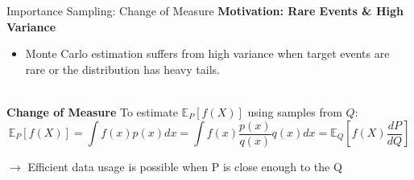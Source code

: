 \documentclass[]{beamer}
\begin{document}



    

\begin{frame}{Importance Sampling: Change of Measure}
    \textbf{Motivation: Rare Events \& High Variance}
    \begin{itemize}
        \item Monte Carlo estimation suffers from high variance when target events are rare or the distribution has heavy tails.
    \end{itemize}
    ~\\
    \textbf{Change of Measure}
    To estimate $\mathbb{E}_P[f(X)]$ using samples from $Q$:
    $$ \mathbb{E}_P[f(X)] = \int f(x) p(x) dx = \int f(x) \frac{p(x)}{q(x)} q(x) dx = \mathbb{E}_Q \left[ f(X) \frac{dP}{dQ} \right] $$

    $\rightarrow$ Efficient data usage is possible when P is close enough to the Q

\end{frame}
\end{document}
